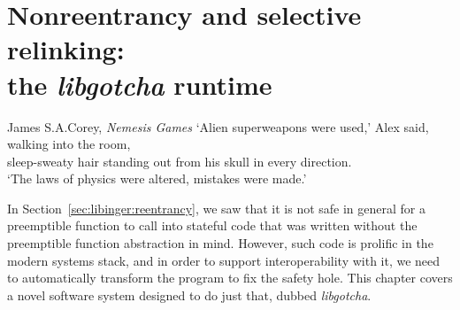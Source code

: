 \chapter{Nonreentrancy and selective relinking: \\ the \textit{libgotcha} runtime}
\label{chap:libgotcha}

\ifdefined\chapquotes
\vspace{-1in}
\begin{chapquote}[1.5in]{James S.\@ A.\@ Corey, \textit{Nemesis Games}}
`Alien superweapons were used,' Alex said, walking into the room, \\
sleep-sweaty hair standing out from his skull in every direction. \\
`The laws of physics were altered, mistakes were made.'
\end{chapquote}
\fi

In Section~\ref{sec:libinger:reentrancy}, we saw that it is not safe in general for a
preemptible function to call into stateful code that was written without the
preemptible function abstraction in mind.  However, such code is prolific in the
modern systems stack, and in order to support interoperability with it, we need to
automatically transform the program to fix the safety hole.  This chapter covers a
novel software system designed to do just that, dubbed \textit{libgotcha}.


\begin{promotesubsections}
\begin{swallowsections}

\end{swallowsections}
\end{promotesubsections}





